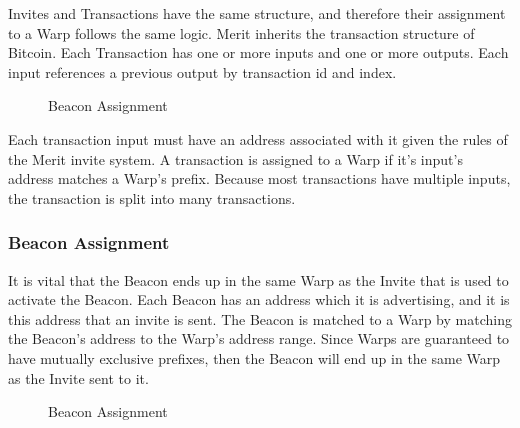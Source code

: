 \documentclass{article}
\begin{document}
Invites and Transactions have the same structure, and therefore their assignment
to a Warp follows the same logic.  Merit inherits the transaction structure
of Bitcoin.  Each Transaction has one or more inputs and one or more outputs.
Each input references a previous output by transaction id and index.

\begin{figure}[H]
    \begin{center}
    \end{center}
    \caption{Beacon Assignment}
\end{figure}

Each transaction input must have an address associated with it given the rules
of the Merit invite system.  A transaction is assigned to a Warp if it's input's
address matches a Warp's prefix.  Because most transactions have multiple inputs,
the transaction is split into many transactions. 

\subsubsection{Beacon Assignment}

It is vital that the Beacon ends up in the same Warp as the Invite that is
used to activate the Beacon.  Each Beacon has an address which it is advertising, and 
it is this address that an invite is sent.  The Beacon is matched to a Warp
by matching the Beacon's address to the Warp's address range.  Since Warps are 
guaranteed to have mutually exclusive prefixes, then the Beacon will end up 
in the same Warp as the Invite sent to it.

\begin{figure}[H]
    \begin{center}
    \end{center}
    \caption{Beacon Assignment}
\end{figure}
\end{document}
